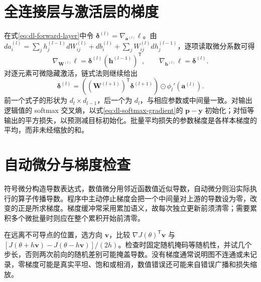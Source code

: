 \section{全连接层与激活层的梯度}
在式\eqref{eq:dl-forward-layer}中令 $\boldsymbol\delta^{(l)}=\nabla_{\mathbf a^{(l)}}\ell$。由 $da_i^{(l)}=\sum_jh_j^{(l-1)}dW_{ij}^{(l)}+db_i^{(l)}+\sum_jW_{ij}^{(l)}dh_j^{(l-1)}$，逐项读取微分系数可得
\begin{equation}
\nabla_{\mathbf W^{(l)}}\ell=\boldsymbol\delta^{(l)}(\mathbf h^{(l-1)})^\mathsf T,
\qquad \nabla_{\mathbf b^{(l)}}\ell=\boldsymbol\delta^{(l)}.
\label{eq:dl-layer-gradients}
\end{equation}
对逐元素可微隐藏激活，链式法则继续给出
\begin{equation}
\boldsymbol\delta^{(l)}=((\mathbf W^{(l+1)})^\mathsf T\boldsymbol\delta^{(l+1)})\odot\phi_l'(\mathbf a^{(l)}).
\label{eq:dl-backprop-recursion}
\end{equation}
前一个式子的形状为 $d_l\times d_{l-1}$，后一个为 $d_l$，与相应参数或中间量一致。对输出逻辑值的 softmax 交叉熵，以式\eqref{eq:dl-softmax-gradient}的 $\mathbf p-\mathbf y$ 初始化；对恒等输出的平方损失，以预测减目标初始化。批量平均损失的参数梯度是各样本梯度的平均，而非未经缩放的和。

\section{自动微分与梯度检查}
符号微分构造导数表达式，数值微分用邻近函数值近似导数，自动微分则沿实际执行的算子传播导数。程序中主动停止梯度会把一个中间量对上游的导数设为零，改变的正是所求梯度。梯度缓冲常采用累加语义，故每次独立更新前须清零；需要累积多个微批量时则应在整个累积开始前清零。

在远离不可导点的位置，选方向 $\mathbf v$，比较 $\nabla J(\theta)^\mathsf T\mathbf v$ 与 $[J(\theta+h\mathbf v)-J(\theta-h\mathbf v)]/(2h)$。检查时固定随机掩码等随机性，并试几个步长，否则两次前向的随机差别可能掩盖导数。没有梯度通常说明图不连通或未记录，零梯度可能是真实平坦、饱和或相消，数值错误还可能来自错误广播和损失缩放。

